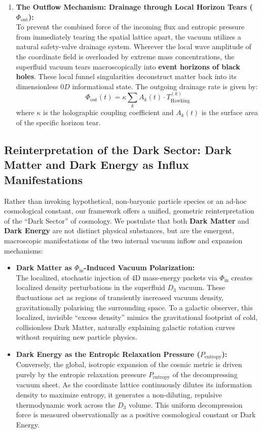 \documentclass[11pt,a4paper]{article}
\theoremstyle{plain}
\theoremstyle{definition}
\theoremstyle{remark}
\begin{document}
\begin{enumerate}
    \item \textbf{The Outflow Mechanism: Drainage through Local Horizon Tears ($\Phi_{\text{out}}$):} \\
    To prevent the combined force of the incoming flux and entropic pressure from immediately tearing the spatial lattice apart, the vacuum utilizes a natural safety-valve drainage system. Wherever the local wave amplitude of the coordinate field is overloaded by extreme mass concentrations, the superfluid vacuum tears macroscopically into \textbf{event horizons of black holes}. These local funnel singularities deconstruct matter back into its dimensionless $0D$ informational state. The outgoing drainage rate is given by:
    \begin{equation}
    \Phi_{\text{out}}(t) = \kappa \sum_{k} A_k(t) \cdot T_{\text{Hawking}}^{(k)}
    \end{equation}
    where $\kappa$ is the holographic coupling coefficient and $A_k(t)$ is the surface area of the specific horizon tear.
\end{enumerate}

\subsection{Reinterpretation of the Dark Sector: Dark Matter and Dark Energy as Influx Manifestations}
Rather than invoking hypothetical, non-baryonic particle species or an ad-hoc cosmological constant, our framework offers a unified, geometric reinterpretation of the ``Dark Sector'' of cosmology. We postulate that both \textbf{Dark Matter} and \textbf{Dark Energy} are not distinct physical substances, but are the emergent, macroscopic manifestations of the two internal vacuum inflow and expansion mechanisms:

\begin{itemize}
    \item \textbf{Dark Matter as $\Phi_{\text{in}}$-Induced Vacuum Polarization:} \\
    The localized, stochastic injection of 4D mass-energy packets via $\Phi_{\text{in}}$ creates localized density perturbations in the superfluid $D_3$ vacuum. These fluctuations act as regions of transiently increased vacuum density, gravitationally polarising the surrounding space. To a galactic observer, this localized, invisible ``excess density'' mimics the gravitational footprint of cold, collisionless Dark Matter, naturally explaining galactic rotation curves without requiring new particle physics.
    
    \item \textbf{Dark Energy as the Entropic Relaxation Pressure ($P_{\text{entropy}}$):} \\
    Conversely, the global, isotropic expansion of the cosmic metric is driven purely by the entropic relaxation pressure $P_{\text{entropy}}$ of the decompressing vacuum sheet. As the coordinate lattice continuously dilutes its information density to maximize entropy, it generates a non-diluting, repulsive thermodynamic work across the $D_3$ volume. This uniform decompression force is measured observationally as a positive cosmological constant or Dark Energy.
\end{itemize}
\end{document}
